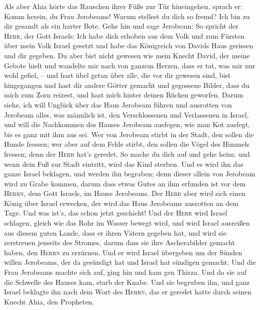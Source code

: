  Als aber Ahia hörte das Rauschen ihrer Füße zur Tür
hineingehen, sprach er: Komm herein, du Frau Jerobeams! Warum stellest
du dich so fremd? Ich bin zu dir gesandt als ein harter Bote.
 Gehe hin und sage Jerobeam: So spricht der \textsc{Herr},
der Gott Israels: Ich habe dich erhoben aus dem Volk und zum Fürsten
über mein Volk Israel gesetzt  und habe das Königreich von
Davids Haus gerissen und dir gegeben. Du aber bist nicht gewesen wie
mein Knecht David, der meine Gebote hielt und wandelte mir nach von
ganzem Herzen, dass er tat, was mir nur wohl gefiel, -- 
und hast übel getan über alle, die vor dir gewesen sind, bist
hingegangen und hast dir andere Götter gemacht und gegossene Bilder,
dass du mich zum Zorn reizest, und hast mich hinter deinen Rücken
geworfen.  Darum siehe, ich will Unglück über das Haus
Jerobeam führen und ausrotten von Jerobeam alles, was männlich ist, den
Verschlossenen und Verlassenen in Israel, und will die Nachkommen des
Hauses Jerobeam ausfegen, wie man Kot ausfegt, bis es ganz mit ihm aus
sei.  Wer von Jerobeam stirbt in der Stadt, den sollen
die Hunde fressen; wer aber auf dem Felde stirbt, den sollen die Vögel
des Himmels fressen; denn der \textsc{Herr} hat's geredet.
 So mache du dich auf und gehe heim; und wenn dein Fuß
zur Stadt eintritt, wird das Kind sterben.  Und es wird
ihn das ganze Israel beklagen, und werden ihn begraben; denn dieser
allein von Jerobeam wird zu Grabe kommen, darum dass etwas Gutes an ihm
erfunden ist vor dem \textsc{Herrn}, dem Gott Israels, im Hause
Jerobeams.  Der \textsc{Herr} aber wird sich einen König
über Israel erwecken, der wird das Haus Jerobeams ausrotten an dem Tage.
Und was ist's, das schon jetzt geschieht!  Und der
\textsc{Herr} wird Israel schlagen, gleich wie das Rohr im Wasser bewegt
wird, und wird Israel ausreißen aus diesem guten Lande, dass er ihren
Vätern gegeben hat, und wird sie zerstreuen jenseits des Stromes, darum
dass sie ihre Ascherabilder gemacht haben, den \textsc{Herrn} zu
erzürnen.  Und er wird Israel übergeben um der Sünden
willen Jerobeams, der da gesündigt hat und Israel hat sündigen gemacht.
 Und die Frau Jerobeams machte sich auf, ging hin und kam
gen Thirza. Und da sie auf die Schwelle des Hauses kam, starb der Knabe.
 Und sie begruben ihn, und ganz Israel beklagte ihn nach
dem Wort des \textsc{Herrn}, das er geredet hatte durch seinen Knecht
Ahia, den Propheten.

